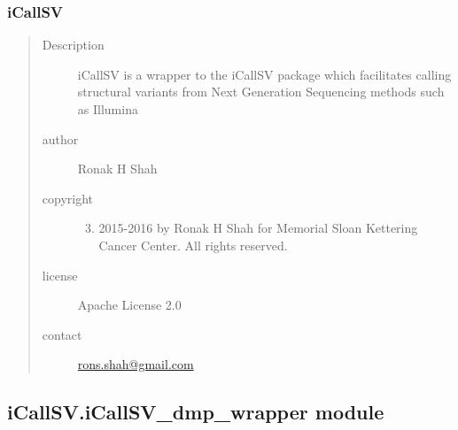 \documentclass[letterpaper,10pt,english]{sphinxmanual}
\begin{document}
\subsubsection{iCallSV}
\label{iCallSV:icallsv}\begin{quote}\begin{description}
\item[{Description}] \leavevmode
iCallSV is a wrapper to the iCallSV package which facilitates calling structural variants from Next Generation Sequencing methods such as Illumina

\item[{author}] \leavevmode
Ronak H Shah

\item[{copyright}] \leavevmode\begin{enumerate}
\setcounter{enumi}{2}
\item {} 
2015-2016 by Ronak H Shah for Memorial Sloan Kettering Cancer Center. All rights reserved.

\end{enumerate}

\item[{license}] \leavevmode
Apache License 2.0

\item[{contact}] \leavevmode
\href{mailto:rons.shah@gmail.com}{rons.shah@gmail.com}

\end{description}\end{quote}


\subsection{iCallSV.iCallSV\_dmp\_wrapper module}
\label{iCallSV:icallsv-icallsv-dmp-wrapper-module}\label{iCallSV:module-iCallSV.iCallSV_dmp_wrapper}
\end{document}
